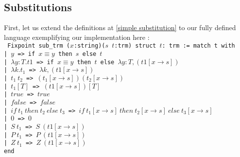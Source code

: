 \documentclass{article}
\begin{document}
    \subsection{Substitutions}
    First, let us extend the definitions at \ref{simple substitution} to our fully defined language exemplifying our implementation here :\\
    \label{substitution1}\texttt{
Fixpoint sub\_trm ($x$:string)($s$ $t$:trm) {struct $t$}: trm := match t with\\
  | $y$ => if $x \equiv y$ then $s$ else $t$\\
  | $\lambda y : T . t1$ =>
        if $x\equiv y$ then $t$ else $\lambda y : T , (t1[x\rightarrow s])$\\
  | $\lambda k. t_1$ =>  $\lambda k, (t1[x\rightarrow s])$\\
  | $t_1 \ t_2$ =>  $(t_1[x\rightarrow s]) (t_2 [x\rightarrow s])$\\
  | $t_1 [ T ]$ => $(t1[x\rightarrow s]) [ T ]$\\
  | $true$ => $true$\\
  | $false$ => $false$\\
  | $if \ t_1 \ then \ t_2 \ else \ t_3$ => 
         $if \ t_1[x\rightarrow s] \ then \ t_2[x\rightarrow s] \ else \ t_3[x\rightarrow s]$\\
  | $0$ => $0$\\
  | $S \ t_1$ => $S \ (t1[x\rightarrow s])$\\
  | $P \ t_1$ => $P \ (t1[x\rightarrow s])$\\
  | $Z \ t_1$ => $Z \ (t1[x\rightarrow s])$\\
end
}
\end{document}
